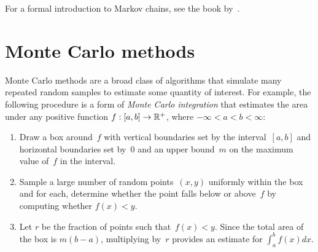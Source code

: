 \documentclass[angelino.tex]{subfiles}
\begin{document}

For a formal introduction to Markov chains, see the book by~\citet{meyn-tweedie:1993}.

\section{Monte Carlo methods}

Monte Carlo methods are a broad class of algorithms that simulate many repeated
random samples to estimate some quantity of interest.
For example, the following procedure is a form of
\emph{Monte Carlo integration} that estimates the area under any positive
function ${f: [a, b] \rightarrow \mathbb{R}^+}$,
where ${-\infty < a < b < \infty}$:
\begin{enumerate}
\item Draw a box around~$f$ with vertical boundaries set by the
interval~$[a, b]$ and horizontal boundaries set by~$0$
and an upper bound~$m$ on the maximum value of~$f$ in the interval.
\item Sample a large number of random points~$(x, y)$ uniformly
within the box and for each, determine whether the point falls below or
above~$f$ by computing whether $f(x) < y$.
\item Let $r$ be the fraction of points such that~$f(x) < y$.
Since the total area of the box is $m(b-a)$, multiplying by~$r$
provides an estimate for $\int_a^b f(x) dx$.
\end{enumerate}
\end{document}
